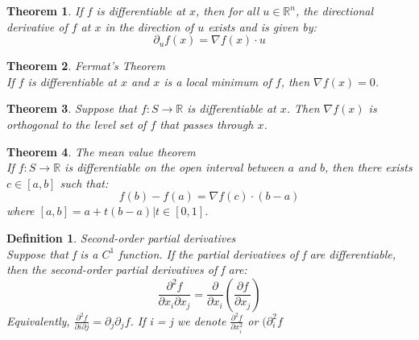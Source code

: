 \documentclass[11pt]{book} %
\newtheorem{theorem}{Theorem}[section]
\newtheorem{definition}{Definition}[section]
\begin{document}
\bigbreak

\begin{theorem}
If $f$ is differentiable at $x$, then for all $u \in \mathbb{R}^n$, the directional derivative of $f$ at $x$ in the direction of $u$ exists and is given by:
\begin{equation}
    \partial_u f(x) = \nabla f(x) \cdot u
\end{equation}
\end{theorem}

\bigbreak

\begin{theorem}{Fermat's Theorem} \\
If $f$ is differentiable at $x$ and $x$ is a local minimum of $f$, then $\nabla f(x) = 0$.
\end{theorem}

\bigbreak

\begin{theorem}
Suppose that $f: S \rightarrow \mathbb{R}$ is differentiable at $x$. Then $\nabla f(x)$ is orthogonal to the level set of $f$ that passes through $x$.    
\end{theorem}

\bigbreak

\begin{theorem}{The mean value theorem} \\
If $f: S \rightarrow \mathbb{R}$ is differentiable on the open interval between $a$ and $b$, then there exists $c \in [a,b]$ such that:
\begin{equation}
    f(b) - f(a) = \nabla f(c) \cdot (b-a)
\end{equation}
where $[a,b] = {a + t(b-a) | t \in [0,1]}$.
\end{theorem}

\bigbreak

\begin{definition}{Second-order partial derivatives} \\
Suppose that f is a $C^1$ function. If the partial derivatives of f are differentiable, then the second-order partial derivatives of f are:
\begin{equation}
    \frac{\partial^2 f}{\partial x_i \partial x_j} = \frac{\partial}{\partial x_i} \left( \frac{\partial f}{\partial x_j} \right) 
\end{equation}
Equivalently, $\frac{\partial^2 f}{\partial i \partial j} = \partial_j \partial_j f$.
If i = j we denote $\frac{\partial^2 f}{\partial x_i^2}$ or $(\partial_i^2 f$
\end{definition}
\end{document}
